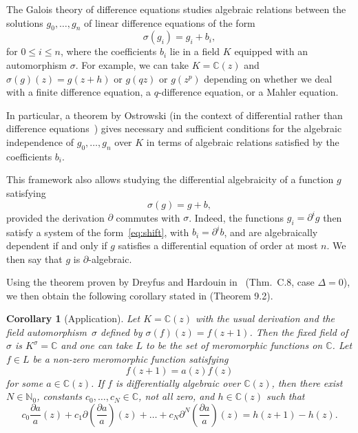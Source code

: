 \documentclass[11pt]{article}
\newcommand\citeS[1]{\cite{#1}}
\newcommand{\beq}{\begin{equation}}
\newcommand{\eeq}{\end{equation}}
\def\N{\mathbb{N}}
\newtheorem{corfr}[thm]{Corollary}
\theoremstyle{definition}
\begin{document}
The Galois theory of difference equations studies algebraic relations between the solutions $g_0,\ldots,g_n$ of linear difference equations of the form
\beq\label{eq:shift}
\sigma(g_i)=g_i +b_i,
\eeq
for $0\le i \le n$, where the coefficients $b_i$ lie in a field $K$ equipped with an automorphism $\sigma$. For example, we can take $K=\mathbb{C}(z)$ and $\sigma(g)(z)=g(z+h)$ or $g(qz)$ or $g(z^p)$ depending on whether we deal with a finite difference equation, a $q$-difference equation, or a Mahler equation.

In particular, a theorem by Ostrowski (in the context of differential rather than difference equations~\cite{Ostrowski}) gives necessary and sufficient conditions for the algebraic independence of $g_0,\ldots,g_n$ over $K$ in terms of algebraic relations satisfied by the coefficients $b_i$.

This framework also allows studying the differential algebraicity of a function $g$ satisfying
$$\sigma(g)=g+b,$$ provided the derivation $\partial$ commutes with $\sigma$. Indeed, the functions $g_i=\partial ^i g$ then satisfy a system of the form~\eqref{eq:shift}, with $b_i=\partial ^i b$, and are algebraically dependent if and only if $g$ satisfies a differential equation of order at most $n$. We then say that $g$ is $\partial$-algebraic.

Using the theorem proven by Dreyfus and Hardouin in~\cite{DreyfHardtderiv} (Thm.~C.8, case $\Delta=0$), we then obtain the following corollary stated in \citeS{franceschi_bousquet_melou_price_hardouin_raschel_stationary_2023} (Theorem 9.2).
\begin{corfr}[Application]
  \label{cor:abstractdiffalgcriterianonhomog}
 Let $K=\mathbb{C}(z)$ with the usual derivation and the field automorphism~$\sigma$ defined by $\sigma (f) (z)=f(z+1)$.
Then the fixed field of $\sigma$ is $K^\sigma=\mathbb{C}$ and one can take $L$ to be the set of meromorphic functions on $\mathbb{C}$.
 Let $f\in L$ be a non-zero meromorphic function satisfying 
 $$f(z+1)= a(z)f(z) $$ 
 for some $a \in \mathbb{C}(z)$. 
 If $f$ is differentially algebraic over $\mathbb{C}(z)$, then there exist $N \in \N_0$,
 constants $c_0,\dots,c_N \in \mathbb{C}$, not all zero, and $h \in \mathbb{C}(z)$ such that
 \begin{equation}\label{eq:equationDA}
   c_0 \frac{\partial a }{a}(z) +c_1 \partial \left(\frac{\partial a }{a}\right) (z) +\dots +c_N \partial^N\left( \frac{\partial a}{a}\right)(z)= h(z+1)-h(z).
 \end{equation} 
\end{corfr}
\end{document}
